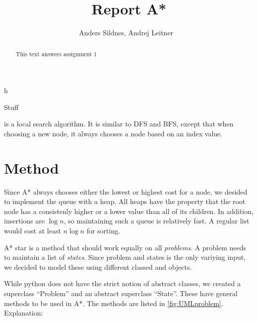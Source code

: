 \documentclass[journal]{IEEEtran}
\begin{document}
%
\title{Report A*}

\author{Anders Sildnes, Andrej Leitner ~%
}%

%
{h}

\maketitle

\begin{abstract}
    This text answers assignment 1
\end{abstract}

\begin{IEEEkeywords}
    Stuff
\end{IEEEkeywords}
 is a local search algorithm. It is similar to DFS and BFS,
except that when choosing a new node, it always chooses a node based on an 
index value. 

\section{Method}
Since A* always chooses either the lowest or highest cost for a node, we desided
to implement the queue with a heap. All heaps have the property that the root
node has a consistenly higher or a lower value than all of its children. In addition,
insertions are $\log{n}$, so maintaining such a queue is relatively fast. A 
regular list would cost at least $n \log{n}$ for sorting.

A* star is a method that should work equally on all \textit{problems}. A problem needs
to maintain a list of \textit{states}. Since problem and states is the only 
variying input, we decided to model these using different classed and objects.

While python does not have the strict notion of abstract classes, we created
a superclass ``Problem'' and an abstract superclass ``State''. These have
general methods to be used in A*. The methods are listed in \autoref{fig:UMLproblem}.
Explanation:
\end{document}
